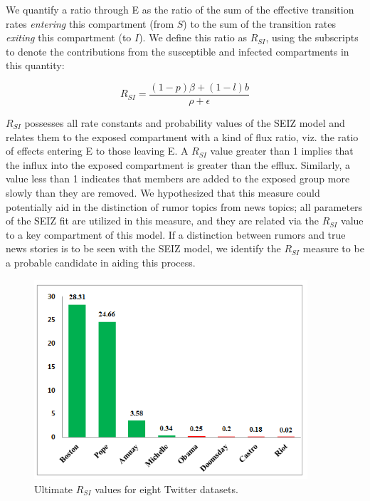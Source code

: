 We quantify a ratio through E as the ratio of the sum of the effective transition rates \textit{entering} this compartment (from $S$) to the sum of the transition rates \textit{exiting} this compartment (to $I$). We define this ratio as $R_{SI}$, using the subscripts to denote the contributions from the susceptible and infected compartments in this quantity:

\begin{equation}
\label{eq:R_es}
R_{SI}=\frac{(1-p)\beta +(1-l)b}{\rho + \epsilon}
\end{equation}

$R_{SI}$ possesses all rate constants and probability values of the SEIZ model and relates them to the exposed compartment with a kind of flux ratio, viz.
the ratio of effects entering E to those leaving E. A $R_{SI}$ value greater than 1 implies that the influx into the exposed compartment is greater than the efflux. Similarly, a value less than 1 indicates that members are added to the exposed group more slowly than they are removed. We hypothesized that this measure could potentially aid in the distinction of rumor topics from news topics; all parameters of the SEIZ fit are utilized in this measure, and they are related via the $R_{SI}$ value to a key compartment of this model. If a distinction between rumors and true news stories is to be seen with the SEIZ model, we identify the $R_{SI}$ measure to be a probable candidate in aiding this process.

\begin{figure}[t]
\centering
  \includegraphics[width=4in]{pictures/reproductive-ratio.png}
   \caption{Ultimate $R_{SI}$ values for eight Twitter datasets.}
  \label{fig:static_ratio}
\end{figure}


